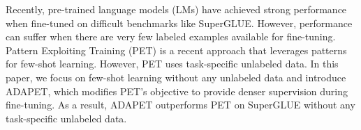 Recently, pre-trained language models (LMs) have achieved strong performance when fine-tuned on difficult benchmarks like SuperGLUE. However, performance can suffer when there are very few labeled examples available for fine-tuning. Pattern Exploiting Training (PET) is a recent approach that leverages patterns for few-shot learning. However, PET uses task-specific unlabeled data. In this paper, we focus on few-shot learning without any unlabeled data and introduce ADAPET, which modifies PET's objective to provide denser supervision during fine-tuning. As a result, ADAPET outperforms PET on SuperGLUE without any task-specific unlabeled data.

